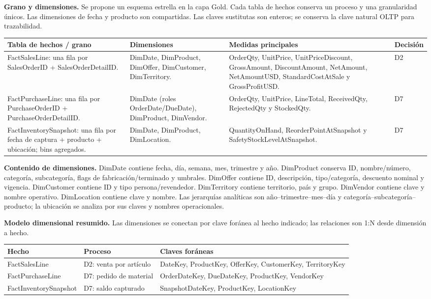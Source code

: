 \documentclass[10pt,a4paper]{article}
\begin{document}
\textbf{Grano y dimensiones.} Se propone un esquema estrella en la capa Gold.
Cada tabla de hechos conserva un proceso y una granularidad únicos. Las
dimensiones de fecha y producto son compartidas. Las claves sustitutas son
enteros; se conserva la clave natural OLTP para trazabilidad.

\small
\begin{longtable}{p{}p{}p{}p{}}
\toprule
\textbf{Tabla de hechos / grano} & \textbf{Dimensiones} &
\textbf{Medidas principales} & \textbf{Decisión}\\
\midrule
\endhead
FactSalesLine: una fila por SalesOrderID + SalesOrderDetailID. &
DimDate, DimProduct, DimOffer, DimCustomer, DimTerritory. &
OrderQty, UnitPrice, UnitPriceDiscount, GrossAmount, DiscountAmount,
NetAmount, NetAmountUSD, StandardCostAtSale y GrossProfitUSD. & D2\\
FactPurchaseLine: una fila por PurchaseOrderID + PurchaseOrderDetailID. &
DimDate (roles OrderDate/DueDate), DimProduct, DimVendor. &
OrderQty, UnitPrice, LineTotal, ReceivedQty, RejectedQty y StockedQty. & D7\\
FactInventorySnapshot: una fila por fecha de captura + producto + ubicación;
bins agregados. & DimDate, DimProduct, DimLocation. &
QuantityOnHand, ReorderPointAtSnapshot y SafetyStockLevelAtSnapshot. & D7\\
\bottomrule
\end{longtable}
\normalsize

\textbf{Contenido de dimensiones.} DimDate contiene fecha, día, semana, mes,
trimestre y año. DimProduct conserva ID, nombre/número, categoría,
subcategoría, flags de fabricación/terminado y umbrales. DimOffer contiene
ID, descripción, tipo/categoría, descuento
nominal y vigencia. DimCustomer contiene ID y tipo persona/revendedor.
DimTerritory contiene territorio, país y grupo.
DimVendor contiene clave y nombre operativo. DimLocation contiene clave y
nombre. Las jerarquías analíticas son año--trimestre--mes--día y
categoría--subcategoría--producto; la ubicación se analiza por sus claves y
nombres operacionales.

\textbf{Modelo dimensional resumido.} Las dimensiones se conectan por clave
foránea al hecho indicado; las relaciones son 1:N desde dimensión a hecho.

\begin{center}
\small
\begin{tabular}{p{}p{}p{}}
\toprule
\textbf{Hecho} & \textbf{Proceso} & \textbf{Claves foráneas}\\
\midrule
FactSalesLine & D2: venta por artículo & DateKey, ProductKey, OfferKey,
CustomerKey, TerritoryKey\\
FactPurchaseLine & D7: pedido de material & OrderDateKey, DueDateKey,
ProductKey, VendorKey\\
FactInventorySnapshot & D7: saldo capturado & SnapshotDateKey, ProductKey,
LocationKey\\
\bottomrule
\end{tabular}
\end{center}
\end{document}
